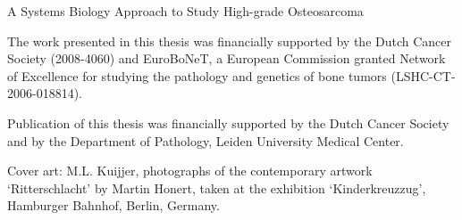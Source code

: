\documentclass[12pt,b5paper]{book}
\begin{document}

\begin{titlepage}
	\thispagestyle{empty}
	{\centering    
		\vspace*{1.cm} 
	 	\vspace*{3.cm} 
		\begin{doublespace}	%
	  	{\huge\sc A Systems Biology Approach to Study High-grade Osteosarcoma}\\
		\end{doublespace}		%
}
\pagebreak 
	\thispagestyle{empty}
	\vspace*{\fill}
\begin{minipage}[b]{0.55\linewidth}
	{\setlength{\parindent}{0cm}
	\begin{singlespace}
		\footnotesize{
			The work presented in this thesis was financially supported by the Dutch Cancer Society (2008-4060) and EuroBoNeT, a European Commission granted Network of Excellence for studying the pathology and genetics of bone tumors (LSHC-CT-2006-018814).\newline

			Publication of this thesis was financially supported by the Dutch Cancer Society and by the Department of Pathology, Leiden University Medical Center.\newline

			Cover art: M.L. Kuijjer, photographs of the contemporary artwork `Ritterschlacht' by Martin Honert, taken at the exhibition `Kinderkreuzzug', Hamburger Bahnhof, Berlin, Germany.\newline

}
\end{singlespace}}
\end{minipage}
\end{titlepage}
\end{document}
